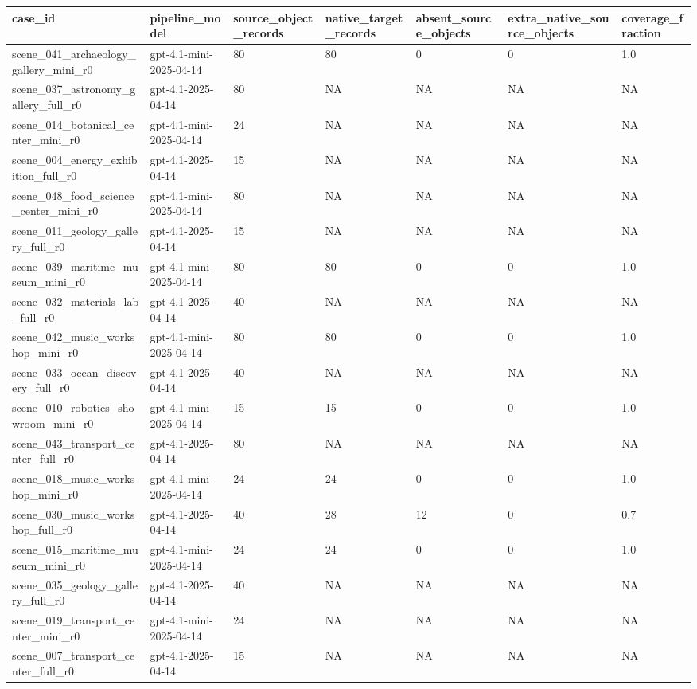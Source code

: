 \begin{tabular}{lllllll}
\toprule
case\_id & pipeline\_model & source\_object\_records & native\_target\_records & absent\_source\_objects & extra\_native\_source\_objects & coverage\_fraction \\
\midrule
scene\_041\_archaeology\_gallery\_mini\_r0 & gpt-4.1-mini-2025-04-14 & 80 & 80 & 0 & 0 & 1.0 \\
scene\_037\_astronomy\_gallery\_full\_r0 & gpt-4.1-2025-04-14 & 80 & NA & NA & NA & NA \\
scene\_014\_botanical\_center\_mini\_r0 & gpt-4.1-mini-2025-04-14 & 24 & NA & NA & NA & NA \\
scene\_004\_energy\_exhibition\_full\_r0 & gpt-4.1-2025-04-14 & 15 & NA & NA & NA & NA \\
scene\_048\_food\_science\_center\_mini\_r0 & gpt-4.1-mini-2025-04-14 & 80 & NA & NA & NA & NA \\
scene\_011\_geology\_gallery\_full\_r0 & gpt-4.1-2025-04-14 & 15 & NA & NA & NA & NA \\
scene\_039\_maritime\_museum\_mini\_r0 & gpt-4.1-mini-2025-04-14 & 80 & 80 & 0 & 0 & 1.0 \\
scene\_032\_materials\_lab\_full\_r0 & gpt-4.1-2025-04-14 & 40 & NA & NA & NA & NA \\
scene\_042\_music\_workshop\_mini\_r0 & gpt-4.1-mini-2025-04-14 & 80 & 80 & 0 & 0 & 1.0 \\
scene\_033\_ocean\_discovery\_full\_r0 & gpt-4.1-2025-04-14 & 40 & NA & NA & NA & NA \\
scene\_010\_robotics\_showroom\_mini\_r0 & gpt-4.1-mini-2025-04-14 & 15 & 15 & 0 & 0 & 1.0 \\
scene\_043\_transport\_center\_full\_r0 & gpt-4.1-2025-04-14 & 80 & NA & NA & NA & NA \\
scene\_018\_music\_workshop\_mini\_r0 & gpt-4.1-mini-2025-04-14 & 24 & 24 & 0 & 0 & 1.0 \\
scene\_030\_music\_workshop\_full\_r0 & gpt-4.1-2025-04-14 & 40 & 28 & 12 & 0 & 0.7 \\
scene\_015\_maritime\_museum\_mini\_r0 & gpt-4.1-mini-2025-04-14 & 24 & 24 & 0 & 0 & 1.0 \\
scene\_035\_geology\_gallery\_full\_r0 & gpt-4.1-2025-04-14 & 40 & NA & NA & NA & NA \\
scene\_019\_transport\_center\_mini\_r0 & gpt-4.1-mini-2025-04-14 & 24 & NA & NA & NA & NA \\
scene\_007\_transport\_center\_full\_r0 & gpt-4.1-2025-04-14 & 15 & NA & NA & NA & NA \\

\end{tabular}
